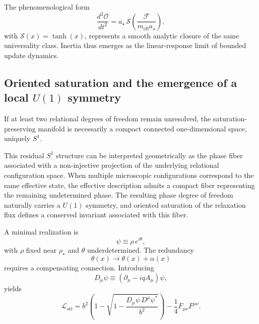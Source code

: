 \documentclass[pdflatex,sn-mathphys-num]{sn-jnl} %
\theoremstyle{remark}
\begin{document}
  The phenomenological form
  \begin{equation}
    \frac{d^2 \mathcal{O}}{dt^2}
    = a_{\star}\,
    \mathcal{S}\!\left(
                   \frac{\mathcal{F}}{m_{\mathrm{eff}} a_{\star}}
    \right),
    \label{eq:saturated_fma}
  \end{equation}
  with $\mathcal{S}(x)=\tanh(x)$, represents a smooth analytic closure of the same universality
  class.
  Inertia thus emerges as the linear-response limit of bounded update dynamics.

  \subsection{Oriented saturation and the emergence of a local $U(1)$ symmetry}
  \label{subsec:oriented_u1}

  If at least two relational degrees of freedom remain unresolved,
  the saturation-preserving manifold is necessarily a compact connected
  one-dimensional space, uniquely $S^1$.

  This residual $S^1$ structure can be interpreted geometrically as the
  phase fiber associated with a non-injective projection of the underlying
  relational configuration space.
  When multiple microscopic configurations correspond to the same effective
  state, the effective description admits a compact fiber representing the
  remaining undetermined phase.
  The resulting phase degree of freedom naturally carries a $U(1)$ symmetry,
  and oriented saturation of the relaxation flux defines a conserved
  invariant associated with this fiber.

  A minimal realization is
  \begin{equation}
    \psi \equiv \rho\,e^{i\theta},
    \label{eq:complex_mode}
  \end{equation}
  with $\rho$ fixed near $\rho_{\star}$ and $\theta$ underdetermined.
  The redundancy
  \begin{equation}
    \theta(x)\rightarrow\theta(x)+\alpha(x)
    \label{eq:local_phase}
  \end{equation}
  requires a compensating connection.
  Introducing
  \begin{equation}
    D_{\mu}\psi \equiv (\partial_{\mu}-iqA_{\mu})\psi,
    \label{eq:covariant_derivative}
  \end{equation}
  yields
  \begin{equation}
    \mathcal{L}_{\mathrm{ori}}
    = b^2\left(
           1-\sqrt{1-\frac{D_{\mu}\psi\,D^{\mu}\psi^{\ast}}{b^2}}
    \right)
    - \frac{1}{4}F_{\mu\nu}F^{\mu\nu}.
    \label{eq:oriented_lagrangian}
  \end{equation}
\end{document}
